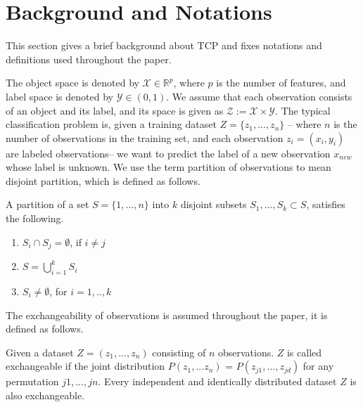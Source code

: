 \documentclass[main]{subfiles}
\begin{document}
\section{Background and Notations}
This section gives a brief background about TCP and fixes notations and definitions used throughout the paper.

The object space is denoted by $\mathcal{X} \in \mathbb{R}^p$, where $p$ is the number of features, and  label space is denoted by $\mathcal{Y} \in (0,1)$. We assume that each observation consists of an object and its label, and its space is given as $\mathcal{Z} := \mathcal{X} \times \mathcal{Y}$. %
The typical classification problem is, given a training dataset $Z = \{ z_1 , ..., z_n \} $ -- where $n$ is the number of observations in the training set, and each observation $z_i = (x_i, y_i)$ are labeled observations-- we want to predict the label of a new observation $x_{new}$ whose label is unknown. We use the term partition of observations to mean disjoint partition, which is defined as follows.


\begin{definition} 
A partition of a set $S = \{ 1,...,n\}$ into $k$ disjoint subsets $S_1, ..., S_k \subset S$, satisfies the following.
\begin{enumerate}
\item $S_i \cap S_j = \emptyset$, if $i \neq j$
\item $S = \bigcup_{i=1}^k S_i$
\item $ S_i \neq \emptyset$, for $i={1,..,k}$
\end{enumerate}
\end{definition}

The exchangeability of observations is assumed throughout the paper, it is defined as follows.
\begin{definition} [Exchangeability]
Given a dataset $Z= (z_1, ..., z_n)$ consisting of $n$ observations. $Z$ is called exchangeable if the joint distribution $P(z_1,...z_n)$ = $P(z_{j1},...,z_{jd})$ for any permutation $j1,...,jn$. Every independent and identically distributed dataset $Z$ is  also exchangeable. 
\end{definition}
\end{document}
